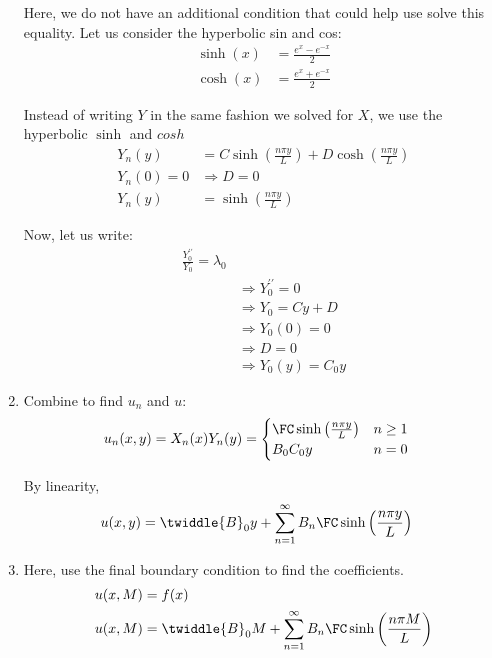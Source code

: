 \begin{enumerate}
  Here, we do not have an additional condition that could help use
  solve this equality. Let us consider the hyperbolic sin and cos:
  \begin{align}
    \sinh(x) & = \frac{e^x - e^{-x}}{2}\\
    \cosh(x) & = \frac{e^x + e^{-x}}{2}
  \end{align}

  Instead of writing $Y$ in the same fashion we solved for $X$,
  we use the hyperbolic $\sinh$ and $cosh$
  \begin{align}
    Y_n(y) & = C \sinh \left(\frac{n \pi y}{L} \right)
    + D \cosh \left( \frac{n \pi y}{L} \right)\\
    Y_n(0) = 0 & \Rightarrow D = 0\\
    Y_n(y) & = \sinh \left( \frac{n \pi y}{L} \right)
  \end{align}

  Now, let us write:
  \begin{align}
    \frac{Y^{\prime\prime}_0}{Y_0} = \lambda_0 &\\
    & \Rightarrow Y^{\prime\prime}_0 = 0\\
    & \Rightarrow Y_0 = Cy + D\\
    & \Rightarrow Y_0(0) = 0\\
    & \Rightarrow D = 0\\
    & \Rightarrow Y_0(y) = C_0 y
  \end{align}

  \item Combine to find $u_n$ and $u$:
  \begin{align}
    u_n(x, y) = X_n(x)Y_n(y) & =
    \begin{cases}
      \FC \sinh \left( \frac{n \pi y}{L} \right) & n \geq 1\\
      B_0C_0y & n = 0
    \end{cases}
  \end{align}

  By linearity,
  \begin{align}
    u(x, y) & = \twiddle{B}_0 y
    + \sum^\infty_{n = 1} B_n \FC \sinh \left( \frac{n \pi y}{L} \right)
  \end{align}

  \item Here, use the final boundary condition to find the coefficients.
  \begin{align}
    u(x, M) & = f(x)\\
    u(x, M) & = \twiddle{B}_0
    M + \sum^\infty_{n = 1} B_n \FC \sinh\left( \frac{n \pi M}{L} \right)
  \end{align}


\end{enumerate}
